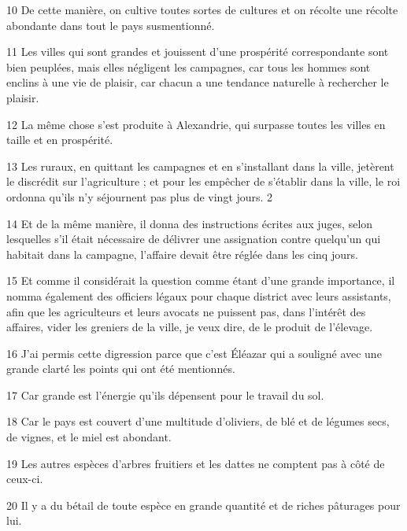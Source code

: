 \par 10 De cette manière, on cultive toutes sortes de cultures et on récolte une récolte abondante dans tout le pays susmentionné.

\par 11 Les villes qui sont grandes et jouissent d'une prospérité correspondante sont bien peuplées, mais elles négligent les campagnes, car tous les hommes sont enclins à une vie de plaisir, car chacun a une tendance naturelle à rechercher le plaisir.

\par 12 La même chose s'est produite à Alexandrie, qui surpasse toutes les villes en taille et en prospérité.

\par 13 Les ruraux, en quittant les campagnes et en s'installant dans la ville, jetèrent le discrédit sur l'agriculture ; et pour les empêcher de s'établir dans la ville, le roi ordonna qu'ils n'y séjournent pas plus de vingt jours. 2

\par 14 Et de la même manière, il donna des instructions écrites aux juges, selon lesquelles s'il était nécessaire de délivrer une assignation contre quelqu'un qui habitait dans la campagne, l'affaire devait être réglée dans les cinq jours.

\par 15 Et comme il considérait la question comme étant d'une grande importance, il nomma également des officiers légaux pour chaque district avec leurs assistants, afin que les agriculteurs et leurs avocats ne puissent pas, dans l'intérêt des affaires, vider les greniers de la ville, je veux dire, de le produit de l'élevage.

\par 16 J'ai permis cette digression parce que c'est Éléazar qui a souligné avec une grande clarté les points qui ont été mentionnés.

\par 17 Car grande est l'énergie qu'ils dépensent pour le travail du sol.

\par 18 Car le pays est couvert d'une multitude d'oliviers, de blé et de légumes secs, de vignes, et le miel est abondant.

\par 19 Les autres espèces d'arbres fruitiers et les dattes ne comptent pas à côté de ceux-ci.

\par 20 Il y a du bétail de toute espèce en grande quantité et de riches pâturages pour lui.

